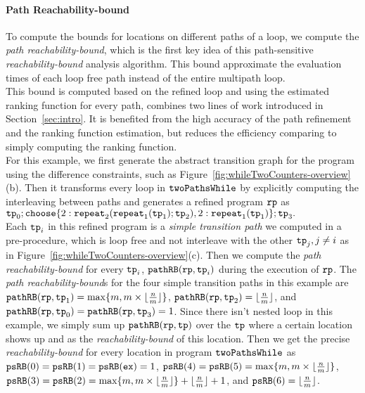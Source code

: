 \paragraph{Path Reachability-bound}
To compute the bounds for locations on different paths of a loop, we compute the \emph{path reachability-bound},
which is the first key idea of this path-sensitive \emph{reachability-bound} analysis algorithm. This bound approximate the evaluation times of each loop free path instead of the entire multipath loop.
\\
This bound is computed based on the refined loop and using the estimated ranking function for every path, combines two lines of work introduced in Section~\ref{sec:intro}. It is benefited from the high accuracy of the path refinement and the ranking function estimation, but reduces the efficiency comparing to simply computing the ranking function.
\\
For this example, we first
generate the abstract transition graph for the program using the difference constraints, such as Figure~\ref{fig:whileTwoCounters-overview}(b).
Then it transforms every loop in $\mathtt{twoPathsWhile}$ by explicitly computing the interleaving between paths and
generates a refined program $\mathtt{rp}$ as
\\
% 
  $
  \tpath_0 ; 
  \rpchoose{2: \rprepeat_2(\rprepeat_1(\tpath_1); \tpath_2), 
  2: \rprepeat_1(\tpath_1)}; \tpath_3.
  $
\\
Each $\mathtt{tp}_i$ in this refined program is a \emph{simple transition path} we computed in a pre-procedure, which is loop free and not interleave with the other $\mathtt{tp}_j, j \neq i$ as in Figure~\ref{fig:whileTwoCounters-overview}(c).
Then we compute the \emph{path reachability-bound} for every $\mathtt{tp}_i$,
$\mathtt{pathRB}(\mathtt{rp}, \mathtt{tp}_i)$ during the execution of $\mathtt{rp}$.
The \emph{path reachability-bound}s for the four simple transition paths in this example are
$\mathtt{pathRB}(\mathtt{rp}, \mathtt{tp}_1) = \max\{m, m \times \lfloor\frac{n}{m}\rfloor\}$,
$\mathtt{pathRB}(\mathtt{rp}, \mathtt{tp}_2) = \lfloor\frac{n}{m}\rfloor$,
and $\mathtt{pathRB}(\mathtt{rp}, \mathtt{tp}_0) = \mathtt{pathRB}(\mathtt{rp}, \mathtt{tp}_3) = 1$.
Since there isn't nested loop in this example, we simply sum up $\mathtt{pathRB}(\mathtt{rp}, \mathtt{tp})$ over the $\mathtt{tp}$ where a certain location shows up
and as the \emph{reachability-bound} of this location.
Then we get the precise \emph{reachability-bound} for every location in program $\mathtt{twoPathsWhile}$ as
$\mathtt{psRB}(0) = \mathtt{psRB}(1) = \mathtt{psRB}(\mathtt{ex}) = 1$,
$\mathtt{psRB}(4) = \mathtt{psRB}(5) = \max\{m, m \times \lfloor\frac{n}{m}\rfloor\}$,
$\mathtt{psRB}(3) = \mathtt{psRB}(2) = \max\{m, m \times \lfloor\frac{n}{m}\rfloor\} + \lfloor\frac{n}{m}\rfloor + 1 $,
and $\mathtt{psRB}(6) = \lfloor\frac{n}{m}\rfloor$.
%
